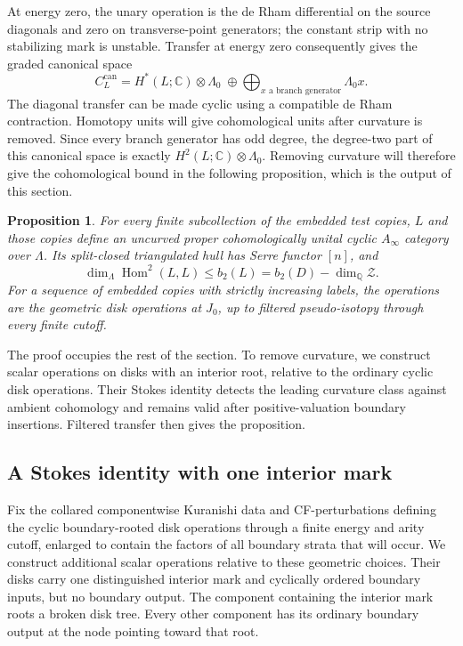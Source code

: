 \documentclass[11pt]{article}
\numberwithin{equation}{section}
\newtheorem{proposition}[theorem]{Proposition}
\theoremstyle{definition}
\theoremstyle{remark}
\begin{document}
At energy zero, the unary operation is the de Rham differential on
the source diagonals and zero on transverse-point generators; the
constant strip with no stabilizing mark is unstable.  Transfer at
energy zero consequently gives the graded canonical space
\begin{equation}\label{curv:canonical-space}
 C_L^{\mathrm{can}}
 =H^*(L;\mathbb C)\otimes\Lambda_0
   \;\oplus\!\!\bigoplus_{x\text{ a branch generator}}\!\Lambda_0 x.
\end{equation}
The diagonal transfer can be made cyclic using a compatible de Rham
contraction.  Homotopy units will give cohomological units after
curvature is removed.  Since every branch generator has odd degree,
the degree-two part of this canonical space is exactly
$H^2(L;\mathbb C)\otimes\Lambda_0$.  Removing curvature will therefore
give the cohomological bound in the following proposition, which is
the output of this section.

\begin{proposition}\label{prop:curvature}
For every finite subcollection of the embedded test copies, $L$ and
those copies define an uncurved proper cohomologically unital cyclic
$A_\infty$ category over $\Lambda$.  Its split-closed triangulated
hull has Serre functor $[n]$, and
\begin{equation}\label{curv:degree-two-bound}
 \dim_\Lambda \operatorname{Hom}^2(L,L)
 \leq b_2(L)=b_2(D)-\dim_\mathbb Q\mathcal Z.
\end{equation}
For a sequence of embedded copies with strictly increasing labels,
the operations are the geometric disk operations at $J_0$, up to
filtered pseudo-isotopy through every finite cutoff.
\end{proposition}

The proof occupies the rest of the section.  To remove curvature, we construct scalar operations on disks with
an interior root, relative to the ordinary cyclic disk operations.
Their Stokes identity detects the leading curvature class against
ambient cohomology and remains valid after positive-valuation
boundary insertions.  Filtered transfer then gives the proposition.

\subsection{A Stokes identity with one interior mark}

Fix the collared componentwise Kuranishi data and CF-perturbations
defining the cyclic boundary-rooted disk operations through a finite
energy and arity cutoff, enlarged to contain the factors of all
boundary strata that will occur.  We construct additional scalar
operations relative to these geometric choices.  Their disks carry one distinguished
interior mark and cyclically ordered boundary inputs, but no boundary
output.  The component containing the interior mark roots a broken
disk tree.  Every other component has its ordinary boundary output
at the node pointing toward that root.
\end{document}
